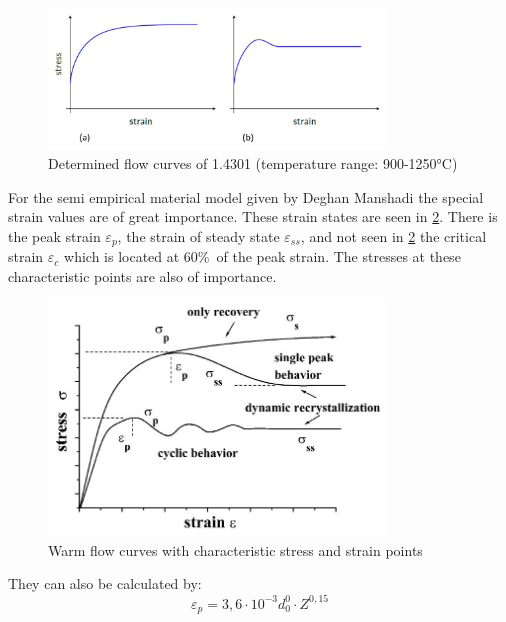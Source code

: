 \begin{figure}[htbp]
 \centering
 \includegraphics[width=0.8\textwidth]{images/flowcurves}
 \caption{Determined flow curves of 1.4301 (temperature range: 900-1250°C)}
 \label{img:flowcurves}
\end{figure}

For the semi empirical material model given by Deghan Manshadi \cite{DEH08} the special strain values are of great importance. These strain states are seen in \ref{img:stressstrainpoints}. There is the peak strain $\varepsilon_{p}$, the strain of steady state $\varepsilon_{ss}$, and not seen in \ref{img:stressstrainpoints} the critical strain $\varepsilon_{c}$ which is located at 60\%\ of the peak strain. The stresses at these characteristic points are also of importance.

\begin{figure}[htbp]
 \centering
 \includegraphics[width=0.8\textwidth]{images/stressstrainpoints}
 \caption{Warm flow curves with characteristic stress and strain points \cite{ELW03}}
 \label{img:stressstrainpoints}
\end{figure}

They can also be calculated by:
\begin{equation}
 \varepsilon_{p} = 3,6\cdot10^{-3}d_{0}^{0}\cdot Z^{0,15}
\end{equation}

